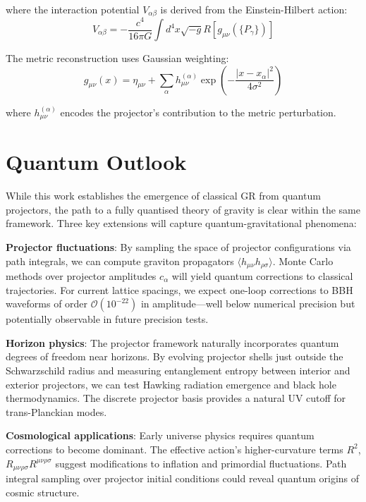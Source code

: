 \documentclass[11pt,a4paper]{article}
\begin{document}
where the interaction potential $V_{\alpha\beta}$ is derived from the Einstein-Hilbert action:
\begin{equation}
V_{\alpha\beta} = -\frac{c^4}{16\pi G} \int d^4x \sqrt{-g} R[g_{\mu\nu}(\{P_\gamma\})]
\end{equation}

The metric reconstruction uses Gaussian weighting:
\begin{equation}
g_{\mu\nu}(x) = \eta_{\mu\nu} + \sum_{\alpha} h_{\mu\nu}^{(\alpha)} \exp\left(-\frac{|x-x_\alpha|^2}{4\sigma^2}\right)
\end{equation}

where $h_{\mu\nu}^{(\alpha)}$ encodes the projector's contribution to the metric perturbation.

\section{Quantum Outlook}
\label{sec:quantum_outlook}

While this work establishes the emergence of classical GR from quantum projectors, the path to a fully quantised theory of gravity is clear within the same framework. Three key extensions will capture quantum-gravitational phenomena:

\textbf{Projector fluctuations}: By sampling the space of projector configurations via path integrals, we can compute graviton propagators $\langle h_{\mu\nu} h_{\rho\sigma} \rangle$. Monte Carlo methods over projector amplitudes $c_\alpha$ will yield quantum corrections to classical trajectories. For current lattice spacings, we expect one-loop corrections to BBH waveforms of order $\mathcal{O}(10^{-22})$ in amplitude---well below numerical precision but potentially observable in future precision tests.

\textbf{Horizon physics}: The projector framework naturally incorporates quantum degrees of freedom near horizons. By evolving projector shells just outside the Schwarzschild radius and measuring entanglement entropy between interior and exterior projectors, we can test Hawking radiation emergence and black hole thermodynamics. The discrete projector basis provides a natural UV cutoff for trans-Planckian modes.

\textbf{Cosmological applications}: Early universe physics requires quantum corrections to become dominant. The effective action's higher-curvature terms $R^2$, $R_{\mu\nu\rho\sigma}R^{\mu\nu\rho\sigma}$ suggest modifications to inflation and primordial fluctuations. Path integral sampling over projector initial conditions could reveal quantum origins of cosmic structure.
\end{document}
